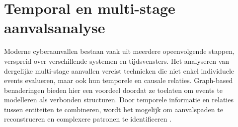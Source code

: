 \section{Temporal en multi-stage aanvalsanalyse}

Moderne cyberaanvallen bestaan vaak uit meerdere opeenvolgende stappen, verspreid over verschillende systemen en tijdsvensters. Het analyseren van dergelijke multi-stage aanvallen vereist technieken die niet enkel individuele events evalueren, maar ook hun temporele en causale relaties.
\newline
\newline
Graph-based benaderingen bieden hier een voordeel doordat ze toelaten om events te modelleren als verbonden structuren. Door temporele informatie en relaties tussen entiteiten te combineren, wordt het mogelijk om aanvalspaden te reconstrueren en complexere patronen te identificeren \autocite{Friji2024}.




